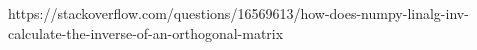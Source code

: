 \documentclass[runningheads]{llncs}
\begin{document}
%
%
%
% 
% 
%
\begin{thebibliography}{1}
https://stackoverflow.com/questions/16569613/how-does-numpy-linalg-inv-calculate-the-inverse-of-an-orthogonal-matrix
\end{thebibliography}
\end{document}
